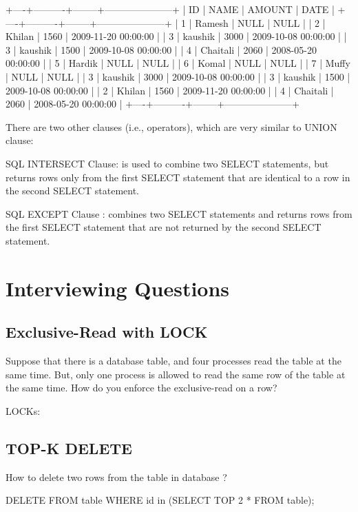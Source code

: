 \begin{Code}
	+----+----------+--------+---------------------+
	| ID | NAME     | AMOUNT | DATE                |
	+----+----------+--------+---------------------+
	|  1 | Ramesh   |   NULL | NULL                |
	|  2 | Khilan   |   1560 | 2009-11-20 00:00:00 |
	|  3 | kaushik  |   3000 | 2009-10-08 00:00:00 |
	|  3 | kaushik  |   1500 | 2009-10-08 00:00:00 |
	|  4 | Chaitali |   2060 | 2008-05-20 00:00:00 |
	|  5 | Hardik   |   NULL | NULL                |
	|  6 | Komal    |   NULL | NULL                |
	|  7 | Muffy    |   NULL | NULL                |
	|  3 | kaushik  |   3000 | 2009-10-08 00:00:00 |
	|  3 | kaushik  |   1500 | 2009-10-08 00:00:00 |
	|  2 | Khilan   |   1560 | 2009-11-20 00:00:00 |
	|  4 | Chaitali |   2060 | 2008-05-20 00:00:00 |
	+----+----------+--------+---------------------+
\end{Code}

There are two other clauses (i.e., operators), which are very similar to UNION clause:

SQL INTERSECT Clause: is used to combine two SELECT statements, but returns rows only from the first SELECT statement that are identical to a row in the second SELECT statement.

SQL EXCEPT Clause : combines two SELECT statements and returns rows from the first SELECT statement that are not returned by the second SELECT statement.


\section{Interviewing Questions}
\subsection{Exclusive-Read with LOCK}
Suppose that there is a database table, and four processes read the table at the same time. But, only one process is allowed to read the same row of the table at the same time. 
How do you enforce the exclusive-read on a row?

LOCKs:

\subsection{TOP-K DELETE}
How to delete two rows from the table in database ? 

\begin{Code}
	DELETE FROM table 
	WHERE id in (SELECT TOP 2 * FROM table);
\end{Code}

